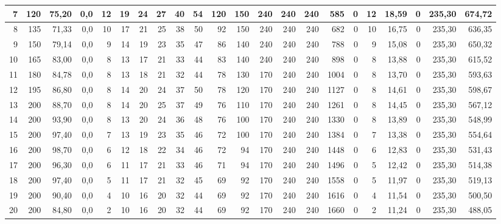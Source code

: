 \begin{appendices}
\begin{table}[H]
{\begin{tabular}{rrrrrrrrrrrrrrrrrrrrrr}
      7  & 120 & 75{,}20 & 0{,}0 & 12 & 19 & 24 & 27 & 40 & 54 & 120 & 150 & 240 & 240 & 240 & 585  & 0 & 12 & 18{,}59 & 0 & 235{,}30 & 674{,}72 \\ \hline
      8  & 135 & 71{,}33 & 0{,}0 & 10 & 17 & 21 & 25 & 38 & 50 & 92  & 150 & 240 & 240 & 240 & 682  & 0 & 10 & 16{,}75 & 0 & 235{,}30 & 636{,}35 \\ \hline
      9  & 150 & 79{,}14 & 0{,}0 & 9  & 14 & 19 & 23 & 35 & 47 & 86  & 140 & 240 & 240 & 240 & 788  & 0 & 9  & 15{,}08 & 0 & 235{,}30 & 650{,}32 \\ \hline
      10 & 165 & 83{,}00 & 0{,}0 & 8  & 13 & 17 & 21 & 33 & 44 & 83  & 140 & 240 & 240 & 240 & 898  & 0 & 8  & 13{,}88 & 0 & 235{,}30 & 615{,}52 \\ \hline
      11 & 180 & 84{,}78 & 0{,}0 & 8  & 13 & 18 & 21 & 32 & 44 & 78  & 130 & 170 & 240 & 240 & 1004 & 0 & 8  & 13{,}70 & 0 & 235{,}30 & 593{,}63 \\ \hline
      12 & 195 & 86{,}80 & 0{,}0 & 8  & 14 & 20 & 24 & 37 & 50 & 78  & 120 & 170 & 240 & 240 & 1127 & 0 & 8  & 14{,}61 & 0 & 235{,}30 & 598{,}67 \\ \hline
      13 & 200 & 88{,}70 & 0{,}0 & 8  & 14 & 20 & 25 & 37 & 49 & 76  & 110 & 170 & 240 & 240 & 1261 & 0 & 8  & 14{,}45 & 0 & 235{,}30 & 567{,}12 \\ \hline
      14 & 200 & 93{,}90 & 0{,}0 & 8  & 13 & 20 & 24 & 36 & 48 & 76  & 100 & 170 & 240 & 240 & 1330 & 0 & 8  & 13{,}89 & 0 & 235{,}30 & 548{,}99 \\ \hline
      15 & 200 & 97{,}40 & 0{,}0 & 7  & 13 & 19 & 23 & 35 & 46 & 72  & 100 & 170 & 240 & 240 & 1384 & 0 & 7  & 13{,}38 & 0 & 235{,}30 & 554{,}64 \\ \hline
      16 & 200 & 98{,}70 & 0{,}0 & 6  & 12 & 18 & 22 & 34 & 46 & 72  & 94  & 170 & 240 & 240 & 1448 & 0 & 6  & 12{,}83 & 0 & 235{,}30 & 531{,}43 \\ \hline
      17 & 200 & 96{,}30 & 0{,}0 & 6  & 11 & 17 & 21 & 33 & 46 & 71  & 94  & 170 & 240 & 240 & 1496 & 0 & 5  & 12{,}42 & 0 & 235{,}30 & 514{,}38 \\ \hline
      18 & 200 & 97{,}40 & 0{,}0 & 5  & 11 & 17 & 21 & 32 & 45 & 69  & 92  & 170 & 240 & 240 & 1558 & 0 & 5  & 11{,}97 & 0 & 235{,}30 & 519{,}13 \\ \hline
      19 & 200 & 90{,}40 & 0{,}0 & 4  & 10 & 16 & 20 & 32 & 44 & 69  & 92  & 170 & 240 & 240 & 1616 & 0 & 4  & 11{,}54 & 0 & 235{,}30 & 500{,}50 \\ \hline
      20 & 200 & 84{,}80 & 0{,}0 & 2  & 10 & 16 & 20 & 32 & 44 & 69  & 92  & 170 & 240 & 240 & 1660 & 0 & 2  & 11{,}24 & 0 & 235{,}30 & 488{,}05 \\ \hline

\end{tabular}}
\end{table}
\end{appendices}
